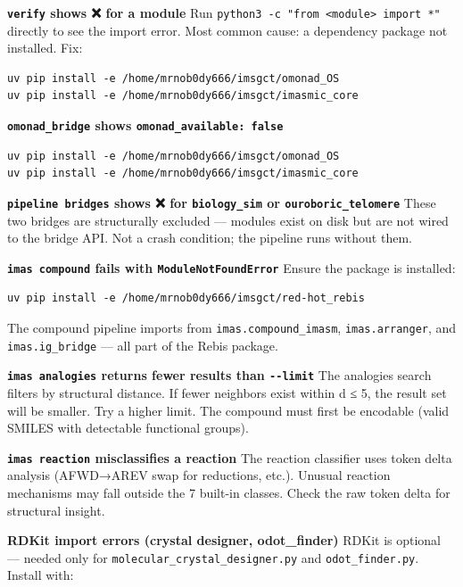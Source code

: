 \textbf{\texttt{verify} shows ❌ for a module} Run
\texttt{python3\ -c\ "from\ \textless{}module\textgreater{}\ import\ *"}
directly to see the import error. Most common cause: a dependency
package not installed. Fix:

\begin{verbatim}
uv pip install -e /home/mrnob0dy666/imsgct/omonad_OS
uv pip install -e /home/mrnob0dy666/imsgct/imasmic_core
\end{verbatim}

\textbf{\texttt{omonad\_bridge} shows
\texttt{omonad\_available:\ false}}

\begin{verbatim}
uv pip install -e /home/mrnob0dy666/imsgct/omonad_OS
uv pip install -e /home/mrnob0dy666/imsgct/imasmic_core
\end{verbatim}

\textbf{\texttt{pipeline\ bridges} shows ❌ for \texttt{biology\_sim} or
\texttt{ouroboric\_telomere}} These two bridges are structurally
excluded --- modules exist on disk but are not wired to the bridge API.
Not a crash condition; the pipeline runs without them.

\textbf{\texttt{imas\ compound} fails with \texttt{ModuleNotFoundError}}
Ensure the package is installed:

\begin{verbatim}
uv pip install -e /home/mrnob0dy666/imsgct/red-hot_rebis
\end{verbatim}

The compound pipeline imports from \texttt{imas.compound\_imasm},
\texttt{imas.arranger}, and \texttt{imas.ig\_bridge} --- all part of the
Rebis package.

\textbf{\texttt{imas\ analogies} returns fewer results than
\texttt{-\/-limit}} The analogies search filters by structural distance.
If fewer neighbors exist within d ≤ 5, the result set will be smaller.
Try a higher limit. The compound must first be encodable (valid SMILES
with detectable functional groups).

\textbf{\texttt{imas\ reaction} misclassifies a reaction} The reaction
classifier uses token delta analysis (AFWD→AREV swap for reductions,
etc.). Unusual reaction mechanisms may fall outside the 7 built-in
classes. Check the raw token delta for structural insight.

\textbf{RDKit import errors (crystal designer, odot\_finder)} RDKit is
optional --- needed only for \texttt{molecular\_crystal\_designer.py}
and \texttt{odot\_finder.py}. Install with:


